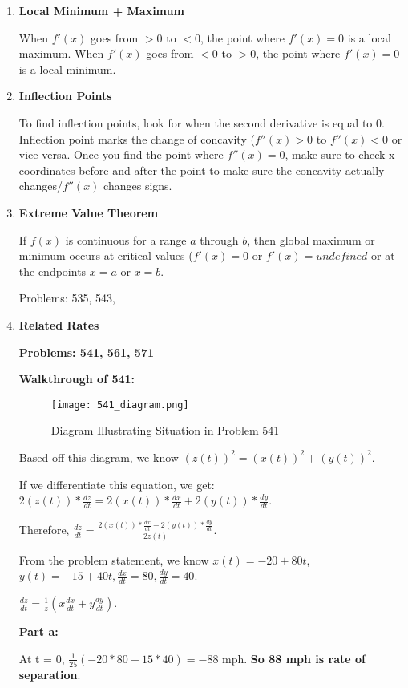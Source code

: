 \documentclass[11pt,twoside]{article}
\begin{document}
\begin{enumerate}
\item \textbf{Local Minimum + Maximum}

When $f'(x)$ goes from $ > 0$ to $ < 0$, the point where $f'(x) = 0$ is a local maximum. When $f'(x)$ goes from $ < 0$ to $ > 0$, the point where $f'(x) = 0$ is a local minimum. 

\item \textbf{Inflection Points}

To find inflection points, look for when the second derivative is equal to 0. Inflection point marks the change of concavity ($f''(x) > 0$ to $f''(x) < 0$ or vice versa. Once you find the point where $f''(x) = 0$, make sure to check x-coordinates before and after the point to make sure the concavity actually changes/$f''(x)$ changes signs. 

\item \textbf{Extreme Value Theorem}

If $f(x)$ is continuous for a range $a$ through $b$, then global maximum or minimum occurs at critical values ($f'(x) = 0$ or $f'(x) = undefined$ or at the endpoints $x = a$ or $x = b$.

Problems: 535, 543, 

\item \textbf{Related Rates}

\textbf{Problems: 541, 561, 571}

\textbf{Walkthrough of 541:}

\begin{figure}[H]
\centering
\texttt{[image: 541\_diagram.png]}
\caption{Diagram Illustrating Situation in Problem 541}
\end{figure}

Based off this diagram, we know $(z(t))^2 = (x(t))^2 + (y(t))^2$.

If we differentiate this equation, we get: $2(z(t)) * \frac{dz}{dt} = 2(x(t)) * \frac{dx}{dt} + 2(y(t)) * \frac{dy}{dt}$. 

Therefore, $\frac{dz}{dt} = \frac{2(x(t)) * \frac{dx}{dt} + 2(y(t)) * \frac{dy}{dt}}{2z(t)}$.

From the problem statement, we know $x(t) = -20 + 80t$, $y(t) = -15 + 40t, \frac{dx}{dt} = 80, \frac{dy}{dt} = 40$.

$\frac{dz}{dt} = \frac{1}{z}(x\frac{dx}{dt} + y\frac{dy}{dt})$.

\textbf{Part a:}

At t = 0, $\frac{1}{25}(-20 * 80 + 15 * 40) = -88$ mph. \textbf{So 88 mph is rate of separation}.


\end{enumerate}
\end{document}
